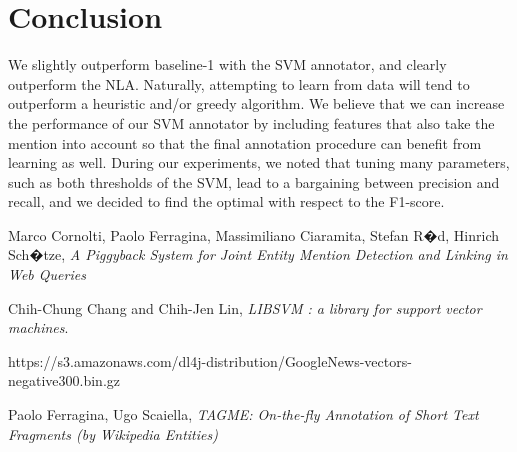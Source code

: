 \documentclass{article}
\begin{document}
\section{Conclusion}
We slightly outperform baseline-1 with the SVM annotator, and clearly outperform the NLA. Naturally, attempting to learn from data will tend to outperform a heuristic and/or greedy algorithm. We believe that we can increase the performance of our SVM annotator by including features that also take the mention into account so that the final annotation procedure can benefit from learning as well. During our experiments, we noted that tuning many parameters, such as both thresholds of the SVM, lead to a bargaining between precision and recall, and we decided to find the optimal with respect to the F1-score.

\begin{thebibliography}{9}

 Marco Cornolti, Paolo Ferragina, Massimiliano Ciaramita, Stefan R�d, Hinrich Sch�tze, \textit{A Piggyback System for Joint Entity Mention Detection and Linking in Web Queries}

 Chih-Chung Chang and Chih-Jen Lin, \textit{LIBSVM : a library for support vector machines}.

 https://s3.amazonaws.com/dl4j-distribution/GoogleNews-vectors-negative300.bin.gz

 Paolo Ferragina, Ugo Scaiella, \textit{TAGME: On-the-fly Annotation of Short Text Fragments (by Wikipedia Entities)}


\end{thebibliography}
\end{document}
